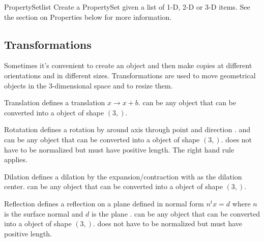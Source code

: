 \begin{classdesc}{PropertySet}{list}
Create a PropertySet given a list of 1-D, 2-D or 3-D items. See the section on Properties below for more information.
\end{classdesc}

\subsection{Transformations}

Sometimes it's convenient to create an object and then make copies at
different orientations and in different sizes.  Transformations are
used to move geometrical objects in the 3-dimensional space and to
resize them.

\begin{classdesc}{Translation}{}
defines a translation $x \to x+b$.  can be any object that can be converted 
into a \numarray object of shape $(3,)$.
\end{classdesc}
              
\begin{classdesc}{Rotatation}{ }
defines a rotation by  around axis through point  and direction . 
 and  can be any object that can be converted 
into a \numarray object of shape $(3,)$.
 does not have to be normalized but must have positive length. The right hand rule~\cite{RIGHTHANDRULE}
applies.
\end{classdesc}


\begin{classdesc}{Dilation}{}
defines a dilation by the expansion/contraction  with 
 as the dilation center.
 can be any object that can be converted 
into a \numarray object of shape $(3,)$.
\end{classdesc}

\begin{classdesc}{Reflection}{}
defines a reflection on a plane defined in normal form $n^t x = d$ 
where $n$ is the surface normal  and $d$ is the plane .
 can be any object that can be converted 
into a \numarray object of shape $(3,)$.
 does not have to be normalized but must have positive length. 
\end{classdesc}

